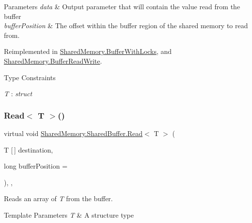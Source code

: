 \begin{DoxyParams}{Parameters}
{\em data} & Output parameter that will contain the value read from the buffer\\
\hline
{\em buffer\+Position} & The offset within the buffer region of the shared memory to read from.\\
\hline
\end{DoxyParams}


Reimplemented in \hyperlink{class_shared_memory_1_1_buffer_with_locks_a1c83bd463abef7c618efdcbe6e9fb317}{Shared\+Memory.\+Buffer\+With\+Locks}, and \hyperlink{class_shared_memory_1_1_buffer_read_write_a4fc92192136290cea195db4ee573843e}{Shared\+Memory.\+Buffer\+Read\+Write}.

\begin{Desc}
\item[Type Constraints]\begin{description}
\item[{\em T} : {\em struct}]\end{description}
\end{Desc}
\mbox{\label{class_shared_memory_1_1_shared_buffer_aba5489c699f444012792fd6331affb03}} 
\subsubsection{\texorpdfstring{Read$<$ T $>$()}{Read< T >()}\hspace{0.1cm}{\footnotesize\ttfamily [2/2]}}
{\footnotesize\ttfamily virtual void \hyperlink{class_shared_memory_1_1_shared_buffer_a95407dfdc38af1afeeb9a9c4a8569982}{Shared\+Memory.\+Shared\+Buffer.\+Read}$<$ T $>$ (\begin{DoxyParamCaption}\item[{T \mbox{[}$\,$\mbox{]}}]{destination,  }\item[{long}]{buffer\+Position = {} }\end{DoxyParamCaption})\hspace{0.3cm}{\ttfamily [inline]}, {\ttfamily [protected]}, {\ttfamily [virtual]}}



Reads an array of {\itshape T}  from the buffer. 


\begin{DoxyTemplParams}{Template Parameters}
{\em T} & A structure type\\
\hline
\end{DoxyTemplParams}

